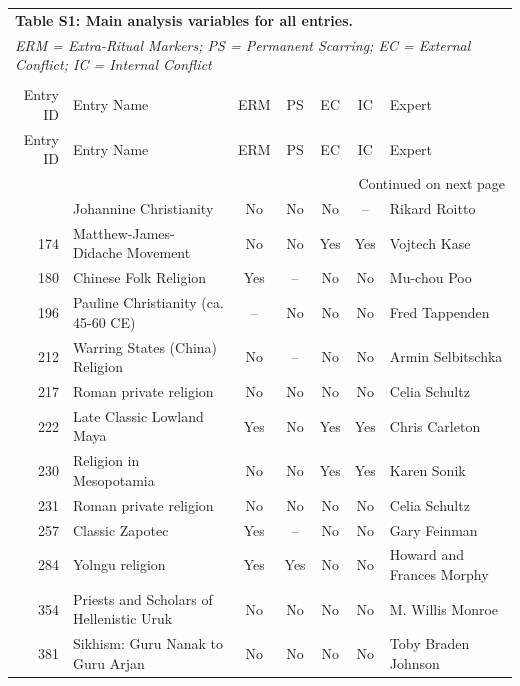 {\footnotesize
\begin{longtable}{rp{3.5cm}ccccp{3cm}}
\multicolumn{7}{l}{\textbf{Table S1: Main analysis variables for all entries.}} \\
\multicolumn{7}{l}{\textit{ERM = Extra-Ritual Markers; PS = Permanent Scarring; EC = External Conflict; IC = Internal Conflict}} \\
\label{tab:si_main_variables} \\
\toprule
Entry ID & Entry Name & ERM & PS & EC & IC & Expert \\
\midrule
\endfirsthead
\toprule
Entry ID & Entry Name & ERM & PS & EC & IC & Expert \\
\midrule
\endhead
\midrule
\multicolumn{7}{r}{Continued on next page} \\
\midrule
\endfoot
\bottomrule
\endlastfoot
173 & {\raggedright Johannine Christianity} & No & No & No & -- & {\raggedright Rikard Roitto} \\
174 & {\raggedright Matthew-James-Didache Movement} & No & No & Yes & Yes & {\raggedright Vojtech Kase} \\
180 & {\raggedright Chinese Folk Religion} & Yes & -- & No & No & {\raggedright Mu-chou Poo} \\
196 & {\raggedright Pauline Christianity (ca. 45-60 CE)} & -- & No & No & No & {\raggedright Fred Tappenden} \\
212 & {\raggedright Warring States (China) Religion} & No & -- & No & No & {\raggedright Armin Selbitschka} \\
217 & {\raggedright Roman private religion} & No & No & No & No & {\raggedright Celia Schultz} \\
222 & {\raggedright Late Classic Lowland Maya} & Yes & No & Yes & Yes & {\raggedright Chris Carleton} \\
230 & {\raggedright Religion in Mesopotamia} & No & No & Yes & Yes & {\raggedright Karen Sonik} \\
231 & {\raggedright Roman private religion} & No & No & No & No & {\raggedright Celia Schultz} \\
257 & {\raggedright Classic Zapotec} & Yes & -- & No & No & {\raggedright Gary Feinman} \\
284 & {\raggedright Yolngu religion} & Yes & Yes & No & No & {\raggedright Howard and Frances Morphy} \\
354 & {\raggedright Priests and Scholars of Hellenistic Uruk} & No & No & No & No & {\raggedright M. Willis Monroe} \\
381 & {\raggedright Sikhism: Guru Nanak to Guru Arjan} & No & No & No & No & {\raggedright Toby Braden Johnson} \\

\end{longtable}}

